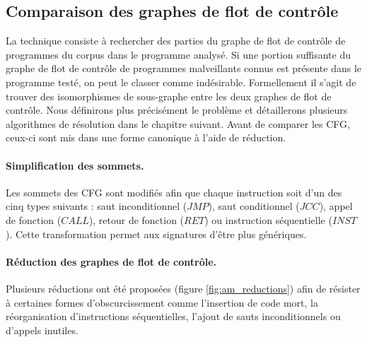 \subsection{Comparaison des graphes de flot de contrôle}
La technique consiste à rechercher des parties du graphe de flot de contrôle de programmes du corpus dans le programme analysé.
Si une portion suffisante du graphe de flot de contrôle de programmes malveillants connus est présente dans le programme testé, on peut le classer comme indésirable. Formellement il s'agit de trouver des isomorphismes de sous-graphe entre les deux graphes de flot de contrôle. Nous définirons plus précisément le problème et détaillerons plusieurs algorithmes de résolution dans le chapitre suivant. Avant de comparer les CFG, ceux-ci sont mis dans une forme canonique à l'aide de réduction.

\paragraph{Simplification des sommets.}
Les sommets des CFG sont modifiés afin que chaque instruction soit d'un des cinq types suivants : saut inconditionnel ($JMP$), saut conditionnel ($JCC$), appel de fonction ($CALL$), retour de fonction ($RET$) ou instruction séquentielle ($INST$).
Cette transformation permet aux signatures d'être plus génériques.

\paragraph{Réduction des graphes de flot de contrôle.}
Plusieurs réductions ont été proposées (figure \ref{fig:am_reductions}) afin de résister à certaines formes d'obscurcissement comme l'insertion de code mort, la réorganisation d'instructions séquentielles, l'ajout de sauts inconditionnels ou d'appels inutiles.


